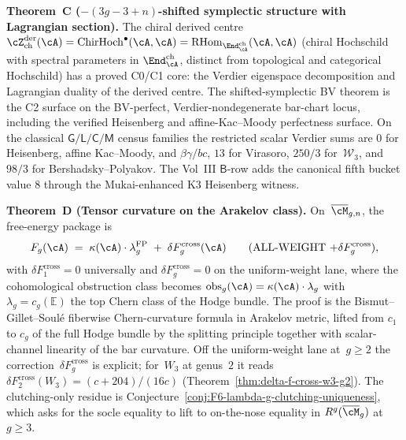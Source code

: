 \medskip

\noindent\textbf{Theorem~C ($-(3g{-}3{+}n)$-shifted symplectic
structure with Lagrangian section).}\enspace
The chiral derived centre
$\cZ^{\mathrm{der}}_{\mathrm{ch}}(\cA) = \ChirHoch^\bullet(\cA,\cA)
= \operatorname{RHom}_{\End^{\mathrm{ch}}_{\cA}}(\cA,\cA)$
(chiral Hochschild with spectral parameters in
$\End^{\mathrm{ch}}_\cA$, distinct from topological and categorical
Hochschild) has a proved C0/C1 core: the Verdier eigenspace
decomposition and Lagrangian duality of the derived centre. The
shifted-symplectic BV theorem is the C2 surface on the BV-perfect,
Verdier-nondegenerate bar-chart locus, including the verified
Heisenberg and affine-Kac--Moody perfectness surface. On the classical
$\mathsf G/\mathsf L/\mathsf C/\mathsf M$ census families the
restricted scalar Verdier sums are
$0$ for Heisenberg, affine Kac--Moody, and $\beta\gamma/bc$,
$13$ for Virasoro, $250/3$ for~$\mathcal{W}_3$, and $98/3$ for
Bershadsky--Polyakov. The Vol~III $\mathsf B$-row adds the canonical
fifth bucket value $8$ through the Mukai-enhanced K3 Heisenberg
witness.

\medskip

\noindent\textbf{Theorem~D (Tensor curvature on the Arakelov
class).}\enspace
On~$\overline{\cM}_{g,n}$, the free-energy package is
\[
 F_g(\cA)
 \;=\;
 \kappa(\cA)\cdot\lambda_g^{\mathrm{FP}}
 \;+\;
 \delta F_g^{\mathrm{cross}}(\cA)
 \qquad\textup{(ALL-WEIGHT $+\delta F_g^{\mathrm{cross}}$)},
\]
with $\delta F_1^{\mathrm{cross}}=0$ universally and
$\delta F_g^{\mathrm{cross}}=0$ on the uniform-weight lane, where
the cohomological obstruction class becomes
$\operatorname{obs}_g(\cA)=\kappa(\cA)\cdot\lambda_g$ with
$\lambda_g = c_g(\mathbb{E})$ the top Chern class of the Hodge
bundle. The proof is the
Bismut--Gillet--Soul\'e fiberwise Chern-curvature formula in
Arakelov metric, lifted from $c_1$ to $c_g$ of the full Hodge bundle
by the splitting principle together with scalar-channel linearity of
the bar curvature. Off the uniform-weight lane at~$g\ge 2$ the
correction~$\delta F_g^{\mathrm{cross}}$ is explicit; for~$W_3$ at
genus~$2$ it reads
$\delta F_2^{\mathrm{cross}}(W_3) = (c+204)/(16c)$
(Theorem~\ref{thm:delta-f-cross-w3-g2}).
The clutching-only residue is
Conjecture~\ref{conj:F6-lambda-g-clutching-uniqueness},
which asks for the socle equality to lift to on-the-nose equality in
$R^g(\overline{\cM}_g)$ at $g\ge3$.

\medskip

